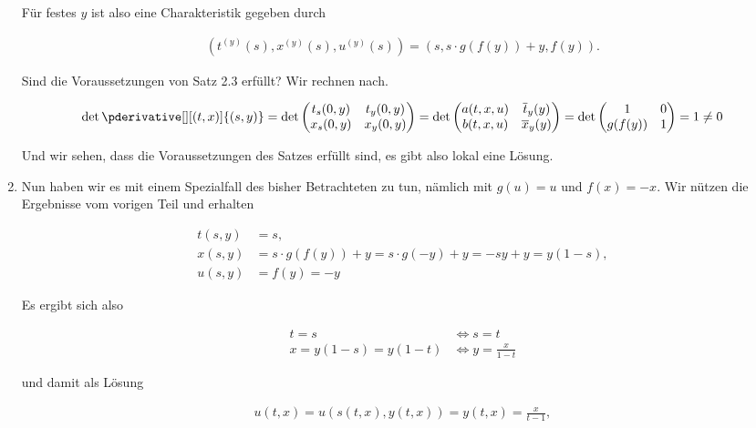 \begin{solution}
\begin{enumerate}[label = (\roman*)]
	Für festes $y$ ist also eine Charakteristik gegeben durch

	\begin{align*}
		(t^{(y)}(s), x^{(y)}(s), u^{(y)}(s))
		=
		(s, s \cdot g(f(y)) + y, f(y)).
	\end{align*}

	Sind die Voraussetzungen von Satz 2.3 erfüllt? Wir rechnen nach.

	\begin{align*}
		\det \pderivative[][(t,x)]{(s,y)} = \det
		\begin{pmatrix}
			t_s(0,y) & t_y(0,y) \\
			x_s(0,y) & x_y(0,y)
		\end{pmatrix}
		=
		\det
		\begin{pmatrix}
			a(t, x, u) & \overline{t}_y(y) \\
			b(t, x, u) & \overline{x}_y(y)
		\end{pmatrix}
		=
		\det
		\begin{pmatrix}
			1 & 0 \\
			g(f(y)) & 1
		\end{pmatrix}
		= 1 \neq 0
	\end{align*}

	Und wir sehen, dass die Voraussetzungen des Satzes erfüllt sind, es gibt also lokal eine Lösung.

	\item Nun haben wir es mit einem Spezialfall des bisher Betrachteten zu tun, nämlich mit $g(u) = u$ und $f(x) = -x$. Wir nützen die Ergebnisse vom vorigen Teil und erhalten

	\begin{align*}
		t(s,y) & = s, \\
		x(s,y) & = s \cdot g(f(y)) + y = s \cdot g(-y) + y = -sy + y = y(1 - s), \\
		u(s,y) & = f(y) = -y
	\end{align*}

	Es ergibt sich also

	\begin{align*}
		t = s
		& \iff
		s = t \\
		x = y(1 - s) = y(1 - t)
		& \iff
		y = \frac{x}{1 - t}
	\end{align*}

	und damit als Lösung

	\begin{align*}
		u(t,x) = u(s(t,x), y(t,x)) = y(t,x) = \frac{x}{t - 1},
	\end{align*}


\end{enumerate}
\end{solution}
